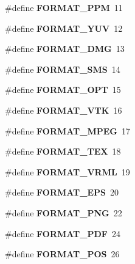 \begin{DoxyCompactItemize}
\item 
\#define {\bfseries F\-O\-R\-M\-A\-T\-\_\-\-P\-P\-M}~11\label{GmshDefines_8h_a290520386adc2b5b88b8e5d79b7590a9}

\item 
\#define {\bfseries F\-O\-R\-M\-A\-T\-\_\-\-Y\-U\-V}~12\label{GmshDefines_8h_adf6c2b61070ddc982b7f86e084fcd117}

\item 
\#define {\bfseries F\-O\-R\-M\-A\-T\-\_\-\-D\-M\-G}~13\label{GmshDefines_8h_adb094bf20953c475b409f27d2c35aecd}

\item 
\#define {\bfseries F\-O\-R\-M\-A\-T\-\_\-\-S\-M\-S}~14\label{GmshDefines_8h_ab0043cb6d4d63c3b9ebec69c70a61078}

\item 
\#define {\bfseries F\-O\-R\-M\-A\-T\-\_\-\-O\-P\-T}~15\label{GmshDefines_8h_a74fb4f2263c6f5fe7e323542e0f8fee8}

\item 
\#define {\bfseries F\-O\-R\-M\-A\-T\-\_\-\-V\-T\-K}~16\label{GmshDefines_8h_ae450ec547ca0959a61239db2398af44f}

\item 
\#define {\bfseries F\-O\-R\-M\-A\-T\-\_\-\-M\-P\-E\-G}~17\label{GmshDefines_8h_a902404084ab8abdbe3ca4d7370386ee3}

\item 
\#define {\bfseries F\-O\-R\-M\-A\-T\-\_\-\-T\-E\-X}~18\label{GmshDefines_8h_a2cbb03300f9251f418f6934cae7c41ee}

\item 
\#define {\bfseries F\-O\-R\-M\-A\-T\-\_\-\-V\-R\-M\-L}~19\label{GmshDefines_8h_a8d658b99c523539926bb2495cf8a1ef1}

\item 
\#define {\bfseries F\-O\-R\-M\-A\-T\-\_\-\-E\-P\-S}~20\label{GmshDefines_8h_ae5eefeed1891f245dc19424b81a7f9b4}

\item 
\#define {\bfseries F\-O\-R\-M\-A\-T\-\_\-\-P\-N\-G}~22\label{GmshDefines_8h_afc2a08f9e2dc303cb8a0370e4343110e}

\item 
\#define {\bfseries F\-O\-R\-M\-A\-T\-\_\-\-P\-D\-F}~24\label{GmshDefines_8h_ab8648041fe08a28e7f47efe00cd44d1c}

\item 
\#define {\bfseries F\-O\-R\-M\-A\-T\-\_\-\-P\-O\-S}~26\label{GmshDefines_8h_ae26d659a37b1f85ba130988869cb550e}


\end{DoxyCompactItemize}
